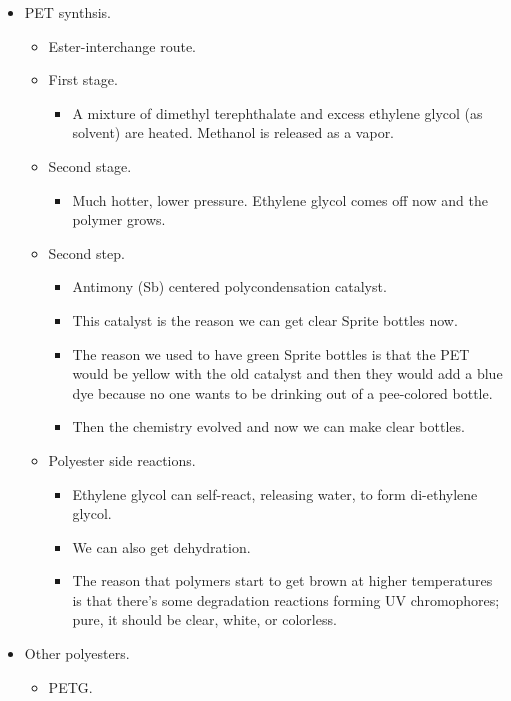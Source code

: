 \documentclass[../notes.tex]{subfiles}
\begin{document}
\begin{itemize}
    \item PET synthsis.
    \begin{itemize}
        \item Ester-interchange route.
        \item First stage.
        \begin{itemize}
            \item A mixture of dimethyl terephthalate and excess ethylene glycol (as solvent) are heated. Methanol is released as a vapor.
        \end{itemize}
        \item Second stage.
        \begin{itemize}
            \item Much hotter, lower pressure. Ethylene glycol comes off now and the polymer grows.
        \end{itemize}
        \item Second step.
        \begin{itemize}
            \item Antimony (Sb) centered polycondensation catalyst.
            \item This catalyst is the reason we can get clear Sprite bottles now.
            \item The reason we used to have green Sprite bottles is that the PET would be yellow with the old catalyst and then they would add a blue dye because no one wants to be drinking out of a pee-colored bottle.
            \item Then the chemistry evolved and now we can make clear bottles.
        \end{itemize}
        \item Polyester side reactions.
        \begin{itemize}
            \item Ethylene glycol can self-react, releasing water, to form di-ethylene glycol.
            \item We can also get dehydration.
            \item The reason that polymers start to get brown at higher temperatures is that there's some degradation reactions forming UV chromophores; pure, it should be clear, white, or colorless.
        \end{itemize}
    \end{itemize}
    \item Other polyesters.
    \begin{itemize}
        \item PETG.

\end{itemize}
\end{itemize}
\end{document}
